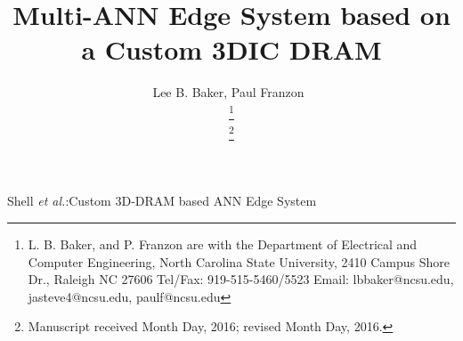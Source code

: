 \documentclass[journal]{IEEEtran}
\begin{document}
%
\title{Multi-ANN Edge System based on a Custom 3DIC DRAM}
%
%
%
\author{{Lee B. Baker, Paul Franzon~}%

\thanks{L. B. Baker, and P. Franzon are with the Department of Electrical and Computer Engineering,
North Carolina State University,
2410 Campus Shore Dr., Raleigh NC 27606 
Tel/Fax:
919-515-5460/5523
Email: 
lbbaker@ncsu.edu,
jasteve4@ncsu.edu,
paulf@ncsu.edu}

\thanks{Manuscript received Month Day, 2016; revised Month Day, 2016.}}

% 
%



%
{Shell \MakeLowercase{\textit{et al.}}:Custom 3D-DRAM based ANN Edge System }
% 
\end{document}
